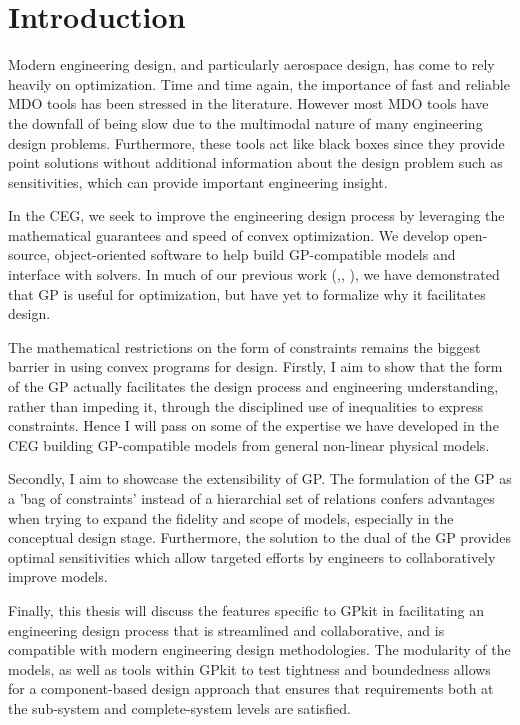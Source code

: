 \chapter{Introduction}
\label{ch1_intro}

Modern engineering design, and particularly aerospace design, has come to rely
heavily on optimization. Time and time again, the importance of fast and
reliable \gls{MDO} tools has been stressed in the literature. However most \gls{MDO} tools
have the downfall of being slow due to the multimodal nature of many
engineering design problems. Furthermore, these tools act like black boxes since
they provide point solutions without additional information about the design problem
such as sensitivities, which can provide important engineering insight.
	
In the \gls{CEG}, we seek to improve the engineering design process by
leveraging the mathematical guarantees and speed of convex optimization. We develop
open-source, object-oriented software to help build \gls{GP}-compatible models and
interface with solvers. In much of our previous work
(\cite{gp_ac_design},\cite{SP_ac_design}, \cite{sp_engine}), we have demonstrated that
\gls{GP} is useful for optimization, but have yet to formalize why it
facilitates design.
 
The mathematical restrictions on the form of constraints remains the biggest
barrier in using convex programs for design. Firstly, I
aim to show that the form of the GP actually facilitates the design process
and engineering understanding, rather than impeding it, through the disciplined use
of inequalities to express constraints. Hence I will
pass on some of the expertise we have developed in the \gls{CEG} building
\gls{GP}-compatible models from general non-linear physical models. 

Secondly, I aim to showcase the extensibility of \gls{GP}.
The formulation of the \gls{GP} as a 'bag of
constraints' instead of a hierarchial set of relations confers advantages 
when trying to expand the fidelity and scope of models, especially in the 
conceptual design stage. Furthermore, the solution to the dual of the \gls{GP}
provides optimal sensitivities which allow targeted efforts by engineers to
collaboratively improve models.

Finally, this thesis will discuss the features specific to GPkit in facilitating
an engineering design process that is streamlined and collaborative, and is
compatible with modern engineering design methodologies. The modularity of the 
models, as well as tools within GPkit to test tightness and boundedness
allows for a component-based design approach that ensures that
requirements both at the sub-system and complete-system levels are satisfied. 


